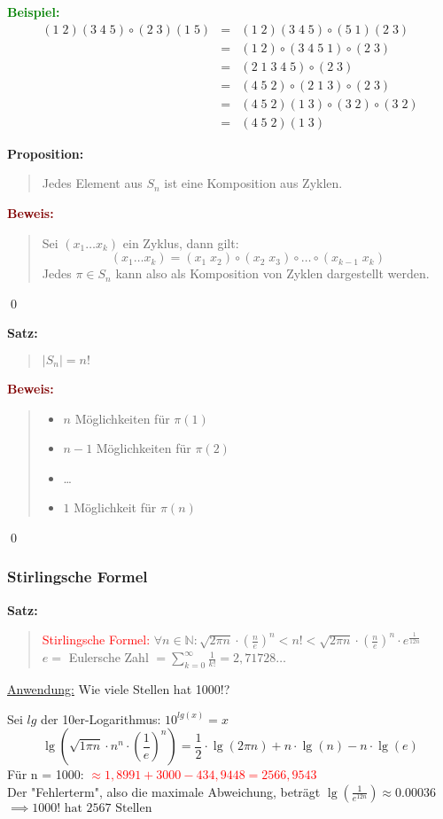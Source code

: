 \documentclass{article}
\newcommand{\red}[1]{\textcolor{red}{#1}}
\newcommand{\green}[1]{\textcolor{green}{#1}}
\newcommand{\dgr}[1]{\textcolor{dgr}{#1}}
\newcommand{\maroon}[1]{\textcolor{maroon}{#1}}
\newcommand{\ex}{\green{\textbf{Beispiel: }}}
\newcommand{\prop}[1]{\dgr{\textbf{Proposition: }}\begin{quote}#1\end{quote}}
\newcommand{\se}[1]{\dgr{\textbf{Satz: }}\begin{quote}#1\end{quote}}
\newcommand{\pr}[1]{\maroon{\textbf{Beweis: }}\begin{quote}#1\end{quote}\qed}
\newcommand{\N}{\mathbb{N}}
\begin{document}
\ex
\begin{equation*}
    \begin{array}{lcl}
        (1 \; 2) (3 \; 4 \; 5) \circ (2 \; 3) (1 \; 5) & = & (1 \; 2) (3 \; 4 \; 5) \circ (5 \; 1) (2 \; 3)\\
        & = & (1 \; 2) \circ (3 \; 4 \; 5 \; 1) \circ (2 \; 3)\\
        & = & (2 \; 1 \; 3 \; 4 \; 5) \circ (2 \; 3)\\
        & = & (4 \; 5 \; 2) \circ (2 \; 1 \; 3) \circ (2 \; 3)\\
        & = & (4 \; 5 \; 2)(1 \; 3) \circ (3 \; 2) \circ (3 \; 2)\\
        & = & (4 \; 5 \; 2)(1 \; 3)
    \end{array}
\end{equation*}

\prop{
    Jedes Element aus $S_n$ ist eine Komposition aus Zyklen.
}

\pr{
    Sei $(x_1 \dots x_k)$ ein Zyklus, dann gilt:
    \begin{equation*}
        (x_1 \dots x_k) = (x_1 \; x_2) \circ (x_2 \; x_3) \circ \dots \circ (x_{k-1} \; x_k)
    \end{equation*}
    Jedes $\pi \in S_n$ kann also als Komposition von Zyklen dargestellt werden.
}

\se{$|S_n| = n!$}

\pr{
    \begin{itemize}
        \item $n$ Möglichkeiten für $\pi(1)$
        \item $n-1$ Möglichkeiten für $\pi(2)$
        \item \dots
        \item $1$ Möglichkeit für $\pi(n)$
    \end{itemize}
}

\subsubsection{Stirlingsche Formel}

\se{
    \red{Stirlingsche Formel:} $\forall n \in \N: \sqrt{2 \pi n} \cdot (\frac{n}{e})^n < n! < \sqrt{2 \pi n} \cdot (\frac{n}{e})^n \cdot e^{\frac{1}{12n}}$\\
    $e = $ Eulersche Zahl $ = \sum_{k = 0}^{\infty}\frac{1}{k!} = 2,71728\dots$
}
\underline{Anwendung:} Wie viele Stellen hat 1000!?

Sei $lg$ der 10er-Logarithmus: $10^{lg(x)} = x$
\begin{equation*}
    \lg(\sqrt{1 \pi n} \cdot n^n \cdot (\frac{1}{e})^n) = \frac{1}{2} \cdot \lg(2 \pi n) + n \cdot \lg(n) - n \cdot \lg(e)
\end{equation*}
Für n = 1000: \red{$\approx 1,8991 + 3000 - 434,9448 = 2566,9543$}\\
Der "Fehlerterm", also die maximale Abweichung, beträgt $\lg(\frac{1}{e^{12n}}) \approx 0.00036$
$\implies 1000! \text{ hat } 2567 \text{ Stellen}$
\end{document}
